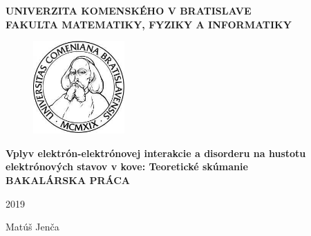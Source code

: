\thispagestyle{empty}
\begin{center}
{\large \bf UNIVERZITA KOMENSKÉHO V BRATISLAVE \\
FAKULTA MATEMATIKY, FYZIKY A INFORMATIKY}
\end{center}
%

\vspace{2cm}
\begin{figure}[!h]
   \centering
     \includegraphics[width=3.5cm]{logoUK.jpg}
\end{figure}

\vspace{1cm}
\begin{center}
{\large \bf Vplyv elektrón-elektrónovej interakcie a disorderu na hustotu elektrónových stavov v kove: Teoretické skúmanie \\
\vspace{3cm}
BAKALÁRSKA PRÁCA}
\end{center}

\vfill
%
\begin{multicols}{2}
{\bf
\begin{flushleft} 2019 \end{flushleft}
\begin{flushright} Matúš Jenča \end{flushright}
}
\end{multicols}

